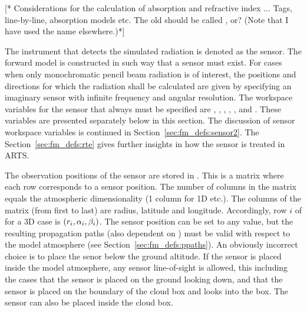 \label{sec:fm_defs:absorption}

[* Considerations for the calculation of absorption and refractive
index ...  Tags, line-by-line, absorption models etc. The old
 should be called , or? (Note that I
have used the name  elsewhere.)*]



\label{sec:fm_defs:sensor1}

The instrument that detects the simulated radiation is denoted as the
sensor. The forward model is constructed in such
way that a sensor must exist. For cases when only monochromatic
pencil beam radiation is of interest, the positions and directions for
which the radiation shall be calculated are given by specifying an
imaginary sensor with infinite frequency and angular resolution. The
workspace variables for the sensor that always must be specified are
, ,
, ,
,  and
. These variables are presented separately below in this
section. The discussion of sensor workspace variables is continued in
Section~\ref{sec:fm_defs:sensor2}. The Section~\ref{sec:fm_defs:rte}
gives further insights in how the sensor is treated in ARTS.


\label{sec:fm_defs:sensorpos}

The observation positions of the sensor are stored in
. This is a matrix where each row corresponds to a
sensor position. The number of columns in the matrix equals the
atmospheric dimensionality (1 column for 1D etc.). The columns of the
matrix (from first to last) are radius, latitude and longitude.
Accordingly, row $i$ of  for a 3D case is
$(r_{i},\alpha_{i},\beta_{i})$. The sensor position can be set to any
value, but the resulting propagation paths (also dependent on
) must be valid with respect to the model atmosphere
(see Section~\ref{sec:fm_defs:ppaths}). An obviously incorrect choice
is to place the senor below the ground altitude. If the sensor is
placed inside the model atmosphere, any sensor line-of-sight is
allowed, this including the cases that the sensor is placed on the
ground looking down, and that the sensor is placed on the boundary of
the cloud box and looks into the box. The sensor can also be placed
inside the cloud box.


